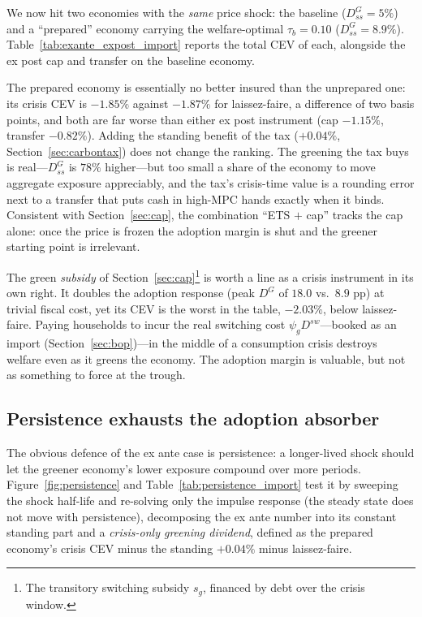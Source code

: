 \documentclass[11pt,a4paper]{article}
\begin{document}
We now hit two economies with the \emph{same} price shock: the baseline
($D^{G}_{ss}=5\%$) and a ``prepared'' economy carrying the welfare-optimal
$\tau_b=0.10$ ($D^{G}_{ss}=8.9\%$). Table~\ref{tab:exante_expost_import}
reports the total CEV of each, alongside the ex post cap and transfer on the
baseline economy.



The prepared economy is essentially no better insured than the unprepared one:
its crisis CEV is $-1.85\%$ against $-1.87\%$ for laissez-faire, a difference of
two basis points, and both are far worse than either ex post instrument (cap
$-1.15\%$, transfer $-0.82\%$). Adding the standing benefit of the tax
($+0.04\%$, Section~\ref{sec:carbontax}) does not change the ranking. The
greening the tax buys is real---$D^{G}_{ss}$ is $78\%$ higher---but too small a
share of the economy to move aggregate exposure appreciably, and the tax's
crisis-time value is a rounding error next to a transfer that puts cash in
high-MPC hands exactly when it binds. Consistent with Section~\ref{sec:cap}, the
combination ``ETS $+$ cap'' tracks the cap alone: once the price is frozen the
adoption margin is shut and the greener starting point is irrelevant.

The green \emph{subsidy} of Section~\ref{sec:cap}\footnote{The transitory
switching subsidy $s_g$, financed by debt over the crisis window.} is worth a
line as a crisis instrument in its own right. It doubles the adoption response
(peak $D^{G}$ of $18.0$ vs.\ $8.9$ pp) at trivial fiscal cost, yet its CEV is
the worst in the table, $-2.03\%$, below laissez-faire. Paying households to
incur the real switching cost $\psi_g D^{sw}$---booked as an import
(Section~\ref{sec:bop})---in the middle of a consumption crisis destroys welfare
even as it greens the economy. The adoption margin is valuable, but not as
something to force at the trough.

\subsection{Persistence exhausts the adoption absorber}
\label{sec:routeA}

The obvious defence of the ex ante case is persistence: a longer-lived shock
should let the greener economy's lower exposure compound over more periods.
Figure~\ref{fig:persistence} and Table~\ref{tab:persistence_import} test it by
sweeping the shock half-life and re-solving only the impulse response (the steady
state does not move with persistence), decomposing the ex ante number into its
constant standing part and a \emph{crisis-only greening dividend}, defined as the
prepared economy's crisis CEV minus the standing $+0.04\%$ minus laissez-faire.
\end{document}

